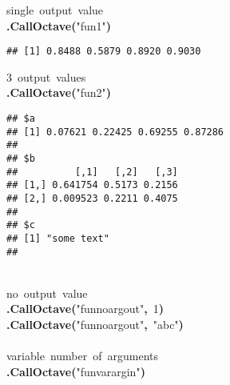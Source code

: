 \documentclass[english,10pt,a4paper]{article}\usepackage{graphicx, color}
\makeatletter
\newcommand{\hlnumber}[1]{\textcolor[rgb]{0,0,0}{#1}}%
\newcommand{\hlfunctioncall}[1]{\textcolor[rgb]{0.501960784313725,0,0.329411764705882}{\textbf{#1}}}%
\newcommand{\hlstring}[1]{\textcolor[rgb]{0.6,0.6,1}{#1}}%
\newcommand{\hlkeyword}[1]{\textcolor[rgb]{0,0,0}{\textbf{#1}}}%
\newcommand{\hlcomment}[1]{\textcolor[rgb]{0.180392156862745,0.6,0.341176470588235}{#1}}%
\newcommand{\hlstd}[1]{\textcolor[rgb]{0,0,0}{#1}}%
\newenvironment{kframe}{%
 \def\FrameCommand##1{\hskip\@totalleftmargin \hskip-\fboxsep
 \colorbox{shadecolor}{##1}\hskip-\fboxsep
     \hskip-\linewidth \hskip-\@totalleftmargin \hskip\columnwidth}%
 \MakeFramed {\advance\hsize-\width
   \@totalleftmargin\z@ \linewidth\hsize
   \@setminipage}}%
 {\par\unskip\endMakeFramed}
\newenvironment{knitrout}{}{} %
\makeatother
\begin{document}
\begin{knitrout}
\color{fgcolor}\begin{kframe}
\begin{flushleft}
\ttfamily\noindent
\hlcomment{\usebox{\hlnormalsizeboxhash}{\ }single{\ }output{\ }value}\hspace*{\fill}\\
\hlstd{}\hlfunctioncall{.CallOctave}\hlkeyword{(}\hlstring{"{}fun1"{}}\hlkeyword{)}\mbox{}
\normalfont
\end{flushleft}
\begin{verbatim}
## [1] 0.8488 0.5879 0.8920 0.9030
\end{verbatim}
\begin{flushleft}
\ttfamily\noindent
\hlcomment{\usebox{\hlnormalsizeboxhash}{\ }3{\ }output{\ }values}\hspace*{\fill}\\
\hlstd{}\hlfunctioncall{.CallOctave}\hlkeyword{(}\hlstring{"{}fun2"{}}\hlkeyword{)}\mbox{}
\normalfont
\end{flushleft}
\begin{verbatim}
## $a
## [1] 0.07621 0.22425 0.69255 0.87286
## 
## $b
##          [,1]   [,2]   [,3]
## [1,] 0.641754 0.5173 0.2156
## [2,] 0.009523 0.2211 0.4075
## 
## $c
## [1] "some text"
## 
\end{verbatim}
\begin{flushleft}
\ttfamily\noindent
\hspace*{\fill}\\
\hlstd{}\hlcomment{\usebox{\hlnormalsizeboxhash}{\ }no{\ }output{\ }value}\hspace*{\fill}\\
\hlstd{}\hlfunctioncall{.CallOctave}\hlkeyword{(}\hlstring{"{}fun\usebox{\hlnormalsizeboxunderscore}noargout"{}}\hlkeyword{,}{\ }\hlnumber{1}\hlkeyword{)}\hspace*{\fill}\\
\hlstd{}\hlfunctioncall{.CallOctave}\hlkeyword{(}\hlstring{"{}fun\usebox{\hlnormalsizeboxunderscore}noargout"{}}\hlkeyword{,}{\ }\hlstring{"{}abc"{}}\hlkeyword{)}\hspace*{\fill}\\
\hlstd{}\hspace*{\fill}\\
\hlstd{}\hlcomment{\usebox{\hlnormalsizeboxhash}{\ }variable{\ }number{\ }of{\ }arguments}\hspace*{\fill}\\
\hlstd{}\hlfunctioncall{.CallOctave}\hlkeyword{(}\hlstring{"{}fun\usebox{\hlnormalsizeboxunderscore}varargin"{}}\hlkeyword{)}\mbox{}

\end{flushleft}
\end{kframe}
\end{knitrout}
\end{document}
